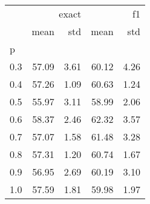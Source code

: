 \begin{tabular}{lrrrr}
\toprule
 & \multicolumn{2}{r}{exact} & \multicolumn{2}{r}{f1} \\
 & mean & std & mean & std \\
p &  &  &  &  \\
\midrule
0.3 & 57.09 & 3.61 & 60.12 & 4.26 \\
0.4 & 57.26 & 1.09 & 60.63 & 1.24 \\
0.5 & 55.97 & 3.11 & 58.99 & 2.06 \\
0.6 & 58.37 & 2.46 & 62.32 & 3.57 \\
0.7 & 57.07 & 1.58 & 61.48 & 3.28 \\
0.8 & 57.31 & 1.20 & 60.74 & 1.67 \\
0.9 & 56.95 & 2.69 & 60.19 & 3.10 \\
1.0 & 57.59 & 1.81 & 59.98 & 1.97 \\
\bottomrule
\end{tabular}
